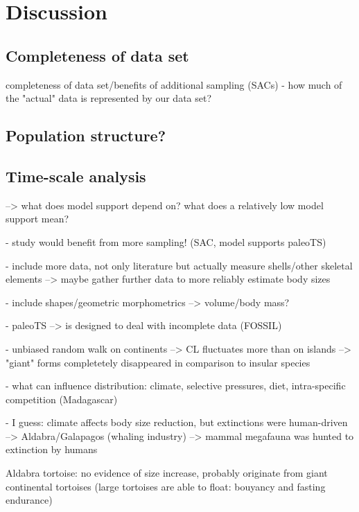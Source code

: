 \section{Discussion}

\subsection{Completeness of data set}

completeness of data set/benefits of additional sampling (SACs)
- how much of the "actual" data is represented by our data set?




\subsection{Population structure?}


\subsection{Time-scale analysis}

--> what does model support depend on? what does a relatively low model support mean?




- study would benefit from more sampling! (SAC, model supports paleoTS)

- include more data, not only literature but actually measure shells/other skeletal elements --> maybe gather further data to more reliably estimate body sizes

- include shapes/geometric morphometrics --> volume/body mass?

- paleoTS --> is designed to deal with incomplete data (FOSSIL)

- unbiased random walk on continents --> CL fluctuates more than on islands --> "giant" forms completetely disappeared in comparison to insular species

- what can influence distribution: climate, selective pressures, diet, intra-specific competition (Madagascar)

- I guess: climate affects body size reduction, but extinctions were human-driven
--> Aldabra/Galapagos (whaling industry)
--> mammal megafauna was hunted to extinction by humans





Aldabra tortoise: no evidence of size increase, probably originate from giant continental tortoises (large tortoises are able to float: bouyancy and fasting endurance)